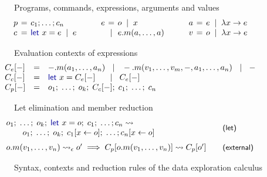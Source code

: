 \documentclass[acmsmall,anonymous,fleqn]{acmart}\settopmatter{printfolios=false,printccs=false,printacmref=false}
\theoremstyle{plain}
\theoremstyle{definition}
\newcommand{\lsep}{\;\;|\;\;}
\newcommand{\kvd}[1]{\textnormal{\textcolor{kvdclr}{\sffamily #1}}}
\newcommand{\narrow}[1]{\hspace{-0.6em}#1\hspace{-0.6em}}
\begin{document}
\newpage
\begin{figure}
\raggedright
{\small\sffamily Programs, commands, expressions, arguments and values}
\begin{equation*}
\hspace{-2em}
\begin{array}{lcl}
p &\narrow{=}& c_1; \ldots; c_n\\
c &\narrow{=}& \kvd{let}~x = e \lsep e\\
\end{array}
\qquad
\begin{array}{lcl}
e &\narrow{=}& o \lsep x \\
  &\narrow{|}& e.m(a, \ldots, a)
\end{array}
\qquad
\begin{array}{lcl}
a &\narrow{=}& e \lsep \lambda x\rightarrow e\\
v &\narrow{=}& o \lsep \lambda x\rightarrow e\\
\end{array}
\end{equation*}

\vspace{0.5em}
{\small\sffamily Evaluation contexts of expressions}
\begin{equation*}
\hspace{-2em}
\begin{array}{lcl}
C_e[-] &=& -.m(a_1, \ldots, a_n) ~\lsep~ -.m(v_1, \ldots, v_{m}, -, a_1,\ldots , a_n) ~\lsep~ -\\
C_c[-] &=& \kvd{let}~x = C_e[-] \hspace{1.25em}\lsep~ C_e[-]\\
C_p[-] &=& o_1;\; \ldots;\; o_{k};\; C_c[-];\; c_{1};\; \ldots;\; c_n\\
\end{array}
\end{equation*}

\vspace{0.5em}
{\small\sffamily Let elimination and member reduction}
\begin{equation*}
\hspace{-2em}
\begin{array}{ll}
\hspace{-0.5em}\begin{array}{l}
o_1;\; \ldots;\; o_{k};\; \kvd{let}~x=o;\; c_{1};\; \ldots; c_n \rightsquigarrow\\
\qquad  o_1;\; \ldots;\; o_{k};\; c_{1}[x\leftarrow o];\; \ldots; c_n[x\leftarrow o]\end{array} &
\quad\text{\small\sffamily(let)}\\[1.2em]
{o.m(v_1, \ldots, v_n) \rightsquigarrow_\epsilon o'}\implies
  {C_p[o.m(v_1, \ldots, v_n)] \rightsquigarrow C_p[o']} &
\quad\text{\small\sffamily (external)}
\end{array}
\end{equation*}

\vspace{-0.5em}
\caption{Syntax, contexts and reduction rules of the data exploration calculus}
\label{fig:dec-calculus}
\end{figure}
\end{document}
